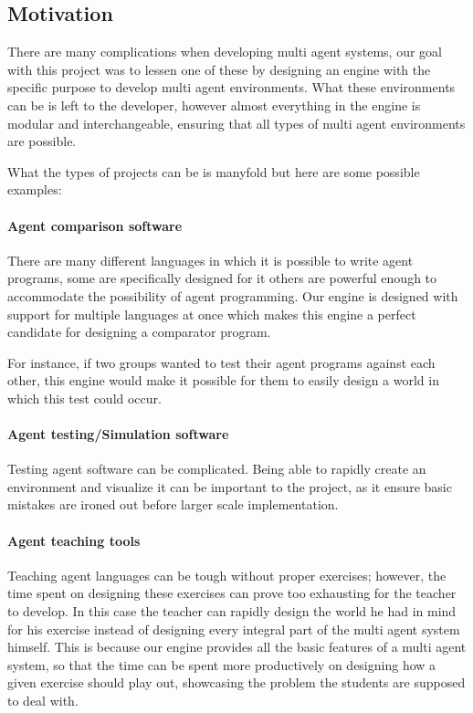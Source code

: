
\subsection{Motivation}

There are many complications when developing multi agent systems,
our goal with this project was to lessen one of these by designing
an engine with the specific purpose to develop multi agent environments.
What these environments can be is left to the developer, however almost
everything in the engine is modular and interchangeable, ensuring
that all types of multi agent environments are possible. 

What the types of projects can be is manyfold but here are some possible
examples:


\paragraph*{Agent comparison software }

There are many different languages in which it is possible to write
agent programs, some are specifically designed for it others are powerful
enough to accommodate the possibility of agent programming. Our engine
is designed with support for multiple languages at once which makes
this engine a perfect candidate for designing a comparator program. 

For instance, if two groups wanted to test their agent programs against
each other, this engine would make it possible for them to easily
design a world in which this test could occur.


\paragraph*{Agent testing/Simulation software}

Testing agent software can be complicated. Being able to rapidly create
an environment and visualize it can be important to the project, as
it ensure basic mistakes are ironed out before larger scale implementation. 


\paragraph*{Agent teaching tools}

Teaching agent languages can be tough without proper exercises; however,
the time spent on designing these exercises can prove too exhausting
for the teacher to develop. In this case the teacher can rapidly design
the world he had in mind for his exercise instead of designing every
integral part of the multi agent system himself. This is because our
engine provides all the basic features of a multi agent system, so
that the time can be spent more productively on designing how a given
exercise should play out, showcasing the problem the students are
supposed to deal with.


